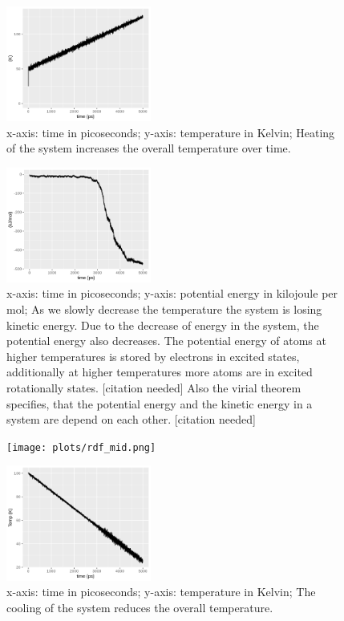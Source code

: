 \documentclass[10pt, a4paper, oneside, twocolumn]{article}
\begin{document}
\begin{figure}[t]
    \centering
    \includegraphics[width=180px]{plots/Heatup/temp_heatup.png}
    \caption{x-axis: time in picoseconds; y-axis: temperature in Kelvin; Heating of the system increases the overall temperature over time.}
    \label{heatup_tempreature}
\end{figure}

\begin{figure}[t]
    \centering
    \includegraphics[width=180px]{plots/potential_energy.png}
    \caption{x-axis: time in picoseconds; y-axis: potential energy in kilojoule per mol; As we slowly decrease the temperature the system is losing kinetic energy. Due to the decrease of energy in the system, the potential energy also decreases.
The potential energy of atoms at higher temperatures is stored by electrons in excited states, additionally at higher temperatures more atoms are in excited rotationally states. [citation needed]
Also the virial theorem specifies, that the potential energy and the kinetic energy in a system are depend on each other. [citation needed]}
    \label{gas_to_liquid_potentialenergy}
\end{figure}

\begin{figure}[t]
    \centering
    \texttt{[image: plots/rdf\_mid.png]}
    \caption{}
    \label{rdf_mid}
\end{figure}

\begin{figure}[t]
    \centering
    \includegraphics[width=180px]{plots/temp_plot.png}
    \caption{x-axis: time in picoseconds; y-axis: temperature in Kelvin; The cooling of the system reduces the overall temperature.}
    \label{gas_to_liquid_temperature}
\end{figure}
\end{document}
